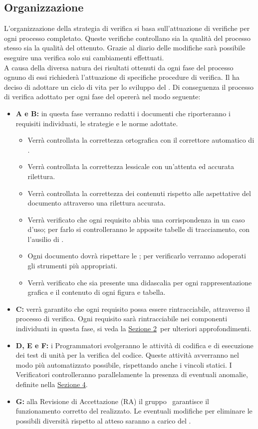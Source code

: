 	\subsection{Organizzazione}
		L'organizzazione della strategia di verifica si basa sull'attuazione di verifiche per ogni processo completato. Queste verifiche controllano sia la qualità del processo stesso sia la qualità del  ottenuto. Grazie al diario delle modifiche sarà possibile eseguire una verifica solo sui cambiamenti effettuati. \\
		A causa della diversa natura dei risultati ottenuti da ogni fase del processo ognuno di essi richiederà l'attuazione di specifiche procedure di verifica. Il  ha deciso di adottare un ciclo di vita  per lo sviluppo del . Di conseguenza il processo di verifica adottato per ogni fase del  opererà nel modo seguente:
		\begin{itemize}
			\item \textbf{A e B:} in questa fase verranno redatti i documenti che riporteranno i requisiti individuati, le strategie e le norme adottate.
			\begin{itemize}
				\item Verrà controllata la correttezza ortografica con il correttore automatico di .
				\item Verrà controllata la correttezza lessicale con un'attenta ed accurata rilettura.
				\item Verrà controllata la correttezza dei contenuti rispetto alle aspettative del documento attraverso una rilettura accurata.
				\item Verrà verificato che ogni requisito abbia una corrispondenza in un caso d'uso; per farlo si controlleranno le apposite tabelle di tracciamento, con l'ausilio di .
				\item Ogni documento dovrà rispettare le \NPdoc; per verificarlo verranno adoperati gli strumenti più appropriati.
				\item Verrà verificato che sia presente una didascalia per ogni rappresentazione grafica e il contenuto di ogni figura e tabella.
			\end{itemize}
			\item \textbf{C:} verrà garantito che ogni requisito possa essere rintracciabile, attraverso il processo di verifica. Ogni requisito sarà rintracciabile nei componenti individuati in questa fase, si veda la \hyperref[sec:2]{Sezione 2}\ per ulteriori approfondimenti.
			\item \textbf{D, E e F:} i Programmatori svolgeranno le attività di codifica e di esecuzione dei test di unità per la verifica del codice. Queste attività avverranno nel modo più automatizzato possibile, rispettando anche i vincoli statici. I Verificatori controlleranno parallelamente la presenza di eventuali anomalie, definite nella \hyperref[sec:4]{Sezione 4}.
			\item \textbf{G:} alla Revisione di Accettazione (RA) il gruppo \AUTORE\ garantisce il funzionamento corretto del  realizzato. Le eventuali modifiche per eliminare le possibili diversità rispetto al  atteso saranno a carico del .
		\end{itemize}
